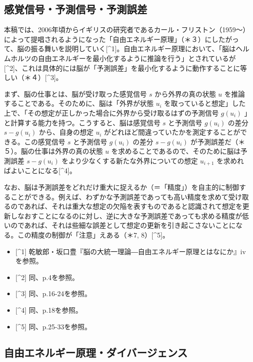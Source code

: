 \subsection{感覚信号・予測信号・予測誤差}\label{ux611fux899aux4fe1ux53f7ux4e88ux6e2cux4fe1ux53f7ux4e88ux6e2cux8aa4ux5dee}

本稿では、2006年頃からイギリスの研究者であるカール・フリストン（1959～）によって提唱されるようになった「自由エネルギー原理」（＊３）にしたがって、脳の振る舞いを説明していく{[}\^{}1{]}。自由エネルギー原理において、「脳はヘルムホルツの自由エネルギーを最小化するように推論を行う」とされているが{[}\^{}2{]}、これは具体的には脳が「予測誤差」を最小化するように動作することに等しい（＊４）{[}\^{}3{]}。

まず、脳の仕事とは、脳が受け取った感覚信号 \(s\) から外界の真の状態
\(u\) を推論することである。そのために、脳は「外界が状態 \(u_i\)
を取っていると想定」した上で、「その想定が正しかった場合に外界から受け取るはずの予測信号
\(g(u_i)\) 」と計算する能力を持つ。こうすると、脳は感覚信号 \(s\)
と予測信号 \(g(u_i)\) の差分 \(s-g(u_i)\) から、自身の想定 \(u_i\)
がどれほど間違っていたかを測定することができる。この感覚信号 \(s\)
と予測信号 \(g(u_i)\) の差分 \(s-g(u_i)\)
が予測誤差だ（＊５）。脳の仕事は外界の真の状態 \(u\)
を求めることであるので、そのために脳は予測誤差 \(s-g(u_i)\)
をより少なくする新たな外界についての想定 \(u_{i+1}\)
を求めればよいことになる{[}\^{}4{]}。

なお、脳は予測誤差をどれだけ重大に捉えるか（＝「精度」）を自主的に制御することができる。例えば、わずかな予測誤差であっても高い精度を求めて受け取るのであれば、それは重大な想定の欠陥を表すものであると認識されて想定を更新しなおすことになるのに対し、逆に大きな予測誤差であっても求める精度が低いのであれば、それは些細な誤差として想定の更新を引き起こさないことになる。この精度の制御が「注意」えある（＊7,
8）{[}\^{}5{]}。

\begin{itemize}
\tightlist
\item
  {[}\^{}1{]}
  乾敏郎・坂口豊『脳の大統一理論―自由エネルギー原理とはなにか』ivを参照。
\item
  {[}\^{}2{]} 同、p.4を参照。
\item
  {[}\^{}3{]} 同、p.16-24を参照。
\item
  {[}\^{}4{]} 同、p.18を参照。
\item
  {[}\^{}5{]} 同、p.25-33を参照。
\end{itemize}

\subsection{自由エネルギー原理・ダイバージェンス}\label{ux81eaux7531ux30a8ux30cdux30ebux30aeux30fcux539fux7406ux30c0ux30a4ux30d0ux30fcux30b8ux30a7ux30f3ux30b9}

